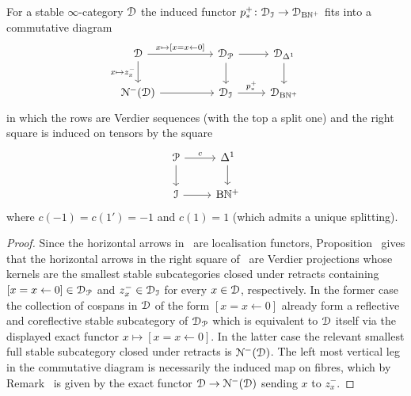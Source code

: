 \begin{proposition}
\label{proposition:PV-sequences-Q1-hyp}%
For a stable $\infty$-category $\mathcal{D}$ the induced functor $p^+_*\colon \mathcal{D}_{\mathcal{I}} \to \mathcal{D}_{\mathrm{B}\mathbb{N}^+}$ fits into a commutative diagram
\begin{equation}
\label{equation:tw-BN-C}%
\begin{tikzcd}
\D \ar[rr,"{x \mapsto [x = x \leftarrow 0]}"]\ar[d,"x \mapsto z_x^-"'] && \D_{\mathcal{P}} \ar[r]\ar[d] & \D_{\Del^1} \ar[d] \\
\cN^-(\D) \ar[rr] && \D_\I \ar[r, "p^+_*"] & \D_{\B\NN^+}
\end{tikzcd}
\end{equation}
in which the rows are Verdier sequences (with the top a split one) and the right square is induced on tensors by the square
\begin{equation}
\label{equation:tw-BN}%
\begin{tikzcd}
\mathcal{P} \ar[r,"c"]\ar[d] & \Del^1\ar[d] \\
\I \ar[r] & \B\NN^+ 
\end{tikzcd}
\end{equation}
where $c(-1) = c(1') =-1$ and $c(1) = 1$ (which admits a unique splitting).
\end{proposition}
\begin{proof}
Since the horizontal arrows in~ are localisation functors, Proposition~ gives that the horizontal arrows in the right square of~ are Verdier projections whose kernels are the smallest stable subcategories closed under retracts containing $[x = x \leftarrow 0] \in \mathcal{D}_{\mathcal{P}}$ and $z^-_x \in \mathcal{D}_{\mathcal{I}}$ for every $x \in \mathcal{D}$, respectively. In the former case the collection of cospans in $\mathcal{D}$ of the form $[x = x \leftarrow 0]$ already form a reflective and coreflective stable subcategory of $\mathcal{D}_{\mathcal{P}}$ which is equivalent to $\mathcal{D}$ itself via the displayed exact functor $x \mapsto [x = x \leftarrow 0]$. In the latter case the relevant smallest full stable subcategory closed under retracts is $\mathcal{N}^-(\mathcal{D})$. The left most vertical leg in the commutative diagram is necessarily the induced map on fibres, which by Remark~ is given by the exact functor $\mathcal{D} \to \mathcal{N}^-(\mathcal{D})$ sending $x$ to $z_x^-$.
\end{proof}



